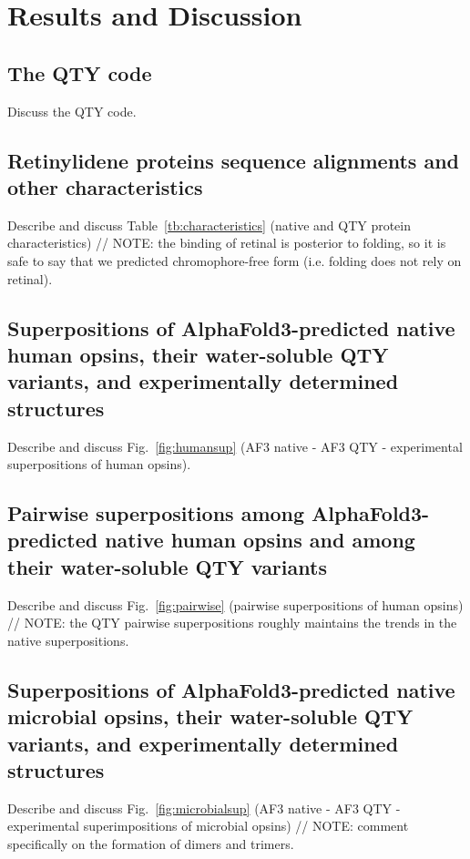 \documentclass[fleqn,10pt,lineno]{manuscript}
\begin{document}
\section*{Results and Discussion}

\subsection*{The QTY code}

Discuss the QTY code. 

\subsection*{Retinylidene proteins sequence alignments and other characteristics}

Describe and discuss Table~\ref{tb:characteristics} (native and QTY protein characteristics) // NOTE: the binding of retinal is posterior to folding, so it is safe to say that we predicted chromophore-free form (i.e. folding does not rely on retinal). 

\subsection*{Superpositions of AlphaFold3-predicted native human opsins, their water-soluble QTY variants, and experimentally determined structures}

Describe and discuss Fig.~\ref{fig:humansup} (AF3 native - AF3 QTY - experimental superpositions of human opsins). 

\subsection*{Pairwise superpositions among AlphaFold3-predicted native human opsins and among their water-soluble QTY variants}

Describe and discuss Fig.~\ref{fig:pairwise} (pairwise superpositions of human opsins) // NOTE: the QTY pairwise superpositions roughly maintains the trends in the native superpositions. 

\subsection*{Superpositions of AlphaFold3-predicted native microbial opsins, their water-soluble QTY variants, and experimentally determined structures}

Describe and discuss Fig.~\ref{fig:microbialsup} (AF3 native - AF3 QTY - experimental superimpositions of microbial opsins) // NOTE: comment specifically on the formation of dimers and trimers. 
\end{document}
